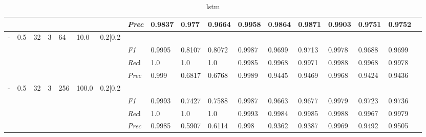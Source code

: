 \begin{table}[]
\begin{tabularx}{\textwidth}{XXXXXXX|X|XXX|XXX|XXXX}
    & & & & & & & \textit{Prec} & 0.9837 & 0.977 & 0.9664 & 0.9958 & 0.9864 & 0.9871 & 0.9903 & 0.9751 & 0.9752 \\ \midrule
    - & 0.5 & 32 & 3 & 64 &10.0 & 0.2|0.2 & & & & & & & & & \\
    & & & & & & & \textit{F1} & 0.9995 & 0.8107 & 0.8072 & 0.9987 & 0.9699        & 0.9713        & 0.9978        & 0.9688        & 0.9699        \\
    & & & & & & & \textit{Rec}l & 1.0 & 1.0 & 1.0    & 0.9985 & 0.9968    & 0.9971    & 0.9988    & 0.9968    & 0.9978    \\
    & & & & & & & \textit{Prec} & 0.999 & 0.6817 & 0.6768 & 0.9989 & 0.9445 & 0.9469 & 0.9968 & 0.9424 & 0.9436 \\ \midrule
    - & 0.5 & 32 & 3 & 256 &100.0 & 0.2|0.2 & & & & & & & & & \\
    & & & & & & & \textit{F1} & 0.9993 & 0.7427 & 0.7588 & 0.9987 & 0.9663        & 0.9677        & 0.9979        & 0.9723        & 0.9736        \\
    & & & & & & & \textit{Rec}l & 1.0 & 1.0 & 1.0    & 0.9993 & 0.9984    & 0.9985    & 0.9988    & 0.9967    & 0.9979    \\
    & & & & & & & \textit{Prec} & 0.9985 & 0.5907 & 0.6114 & 0.998 & 0.9362 & 0.9387 & 0.9969 & 0.9492 & 0.9505 \\ \midrule
    \end{tabularx}
    \caption{lstm}
    \label{tab:all_results_lstm}
    \end{table}
    
